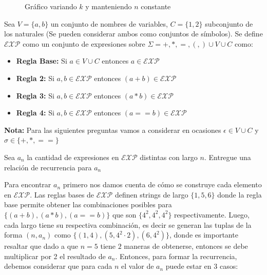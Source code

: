 \documentclass[letterpaper,10pt,table, dvipsnames]{article}
\newcommand{\EXP}{\mathcal{EXP}}
\begin{document}
\begin{figure}[htp]
  \centering
  
  \caption{Gráfico variando $k$ y manteniendo $n$ constante}\label{fig:data2}
\end{figure}
\newpage

\begin{tcolorbox}[colback=red!5!white,colframe=red!75!black]
 Sea $V = \{a,b\}$ un conjunto de nombres de variables, $C = \{1,2\}$ subconjunto de los naturales (Se pueden considerar ambos como conjuntos de símbolos). Se define $\mathcal{EXP}$ como un conjunto de expresiones sobre $\Sigma = {+,*,=,(,)} \cup V \cup C$ como: 
\begin{itemize}
  \item \textbf{Regla Base:} Si $a \in V \cup C$ entonces $a \in \mathcal{EXP}$
  \item \textbf{Regla 2:} Si $a,b \in \mathcal{EXP}$ entonces $(a + b) \in \mathcal{EXP}$
  \item \textbf{Regla 3:} Si $a,b \in \mathcal{EXP}$ entonces $(a * b) \in \mathcal{EXP}$
  \item \textbf{Regla 4:} Si $a,b \in \mathcal{EXP}$ entonces $(a == b) \in \mathcal{EXP}$
\end{itemize}
\end{tcolorbox}

\textbf{Nota: } Para las siguientes preguntas vamos a considerar en ocasiones $\epsilon \in V\cup C$ y $\sigma \in \{+,*,==\} $

\begin{tcolorbox}
 Sea $a_n $ la cantidad de expresiones en $\mathcal{EXP}$ distintas con largo $n$. Entregue una relación de recurrencia para $a_n$ 
\end{tcolorbox}

Para encontrar $a_{n}$ primero nos damos cuenta de cómo se construye cada elemento en $\EXP$. Las reglas bases de $\EXP$ definen strings de largo $\{1,5,6\}$ donde la regla base permite obtener las combinaciones posibles para $\{(a + b), (a * b), (a==b)\}$ que son $\{4^2, 4^2 ,4^2\} $ respectivamente. Luego, cada largo tiene su respectiva combinación, es decir se generan las tuplas de la forma $(n,a_n)$ como $\{ (1,4), (5,4^2 \cdot 2), (6, 4^2) \}$, donde es importante resaltar que dado a que $n=5$ tiene $2$ maneras de obtenerse, entonces se debe multiplicar por 2 el resultado de $a_n $. Entonces, para formar la recurrencia, debemos considerar que para cada $n$ el valor de $a_n $ puede estar en 3 casos:
\end{document}
